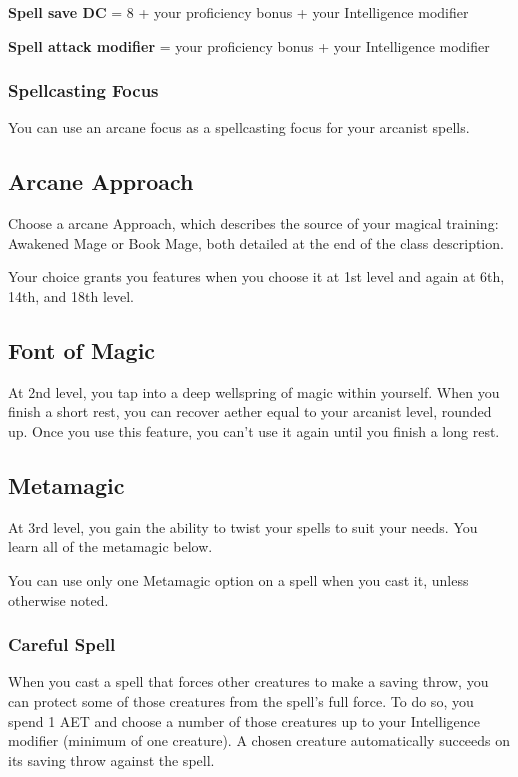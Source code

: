 \textbf{Spell save DC} = 8 + your proficiency bonus + your Intelligence modifier

\textbf{Spell attack modifier} = your proficiency bonus + your Intelligence modifier

\subsubsection{Spellcasting Focus}

You can use an arcane focus as a spellcasting focus for your arcanist spells.

\subsection{Arcane Approach}

Choose a arcane Approach, which describes the source of your magical training: Awakened Mage or Book Mage, both detailed at the end of the class description.

Your choice grants you features when you choose it at 1st level and again at 6th, 14th, and 18th level.

\subsection{Font of Magic}

At 2nd level, you tap into a deep wellspring of magic within yourself. When you finish a short rest, you can recover aether equal to your arcanist level, rounded up. Once you use this feature, you can't use it again until you finish a long rest.

\subsection{Metamagic}

At 3rd level, you gain the ability to twist your spells to suit your needs. You learn all of the metamagic below.

You can use only one Metamagic option on a spell when you cast it, unless otherwise noted.

\subsubsection{Careful Spell}

When you cast a spell that forces other creatures to make a saving throw, you can protect some of those creatures from the spell's full force. To do so, you spend 1 AET and choose a number of those creatures up to your Intelligence modifier (minimum of one creature). A chosen creature automatically succeeds on its saving throw against the spell.

